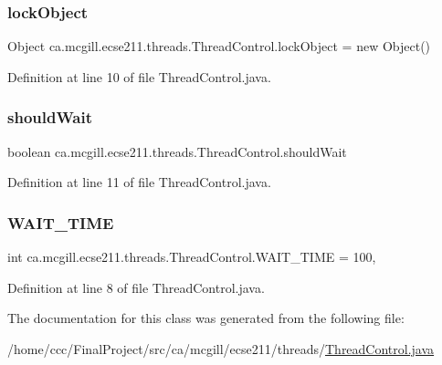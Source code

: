 \subsubsection{\texorpdfstring{lock\+Object}{lockObject}}
{\footnotesize\ttfamily Object ca.\+mcgill.\+ecse211.\+threads.\+Thread\+Control.\+lock\+Object = new Object()\hspace{0.3cm}{\ttfamily [protected]}}



Definition at line 10 of file Thread\+Control.\+java.

\mbox{\label{classca_1_1mcgill_1_1ecse211_1_1threads_1_1_thread_control_a8252930dab1b067da64cf2afae4fc630}} 
\subsubsection{\texorpdfstring{should\+Wait}{shouldWait}}
{\footnotesize\ttfamily boolean ca.\+mcgill.\+ecse211.\+threads.\+Thread\+Control.\+should\+Wait\hspace{0.3cm}{\ttfamily [protected]}}



Definition at line 11 of file Thread\+Control.\+java.

\mbox{\label{classca_1_1mcgill_1_1ecse211_1_1threads_1_1_thread_control_a395cfe1d73b3ef14da0830ed0a499f82}} 
\subsubsection{\texorpdfstring{W\+A\+I\+T\+\_\+\+T\+I\+ME}{WAIT\_TIME}}
{\footnotesize\ttfamily int ca.\+mcgill.\+ecse211.\+threads.\+Thread\+Control.\+W\+A\+I\+T\+\_\+\+T\+I\+ME = 100\hspace{0.3cm}{\ttfamily [static]}, {\ttfamily [protected]}}



Definition at line 8 of file Thread\+Control.\+java.



The documentation for this class was generated from the following file\+:\begin{DoxyCompactItemize}
\item 
/home/ccc/\+Final\+Project/src/ca/mcgill/ecse211/threads/\hyperlink{_thread_control_8java}{Thread\+Control.\+java}\end{DoxyCompactItemize}
